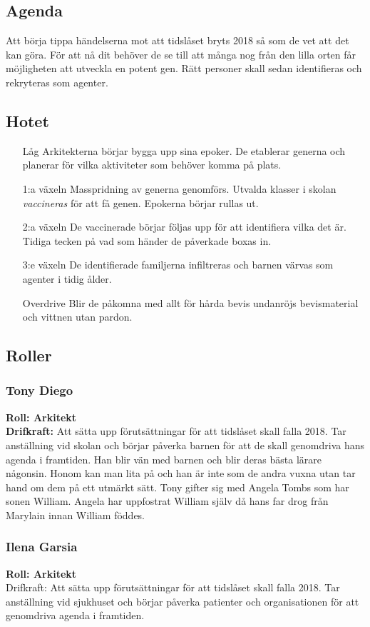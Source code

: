 \documentclass[a5paper,10pt]{report}
\begin{document}
\subsection{Agenda}
Att börja tippa händelserna mot att tidslåset bryts 2018 så som de vet att det kan göra. För att nå dit behöver de se till att många nog från den lilla orten får möjligheten att utveckla en potent gen. Rätt personer skall sedan identifieras och rekryteras som agenter.
\subsection{Hotet}
\begin{itemize}
  \item[Låg] Arkitekterna börjar bygga upp sina epoker. De etablerar generna och planerar för vilka aktiviteter som behöver komma på plats.
  \item[1:a växeln] Masspridning av generna genomförs. Utvalda klasser i skolan \textit{vaccineras} för att få genen. Epokerna börjar rullas ut.
  \item[2:a växeln] De vaccinerade börjar följas upp för att identifiera vilka det är. Tidiga tecken på vad som händer de påverkade boxas in.
  \item[3:e växeln] De identifierade familjerna infiltreras och barnen värvas som agenter i tidig ålder.
  \item[Overdrive] Blir de påkomna med allt för hårda bevis undanröjs bevismaterial och vittnen utan pardon.
\end{itemize}
\subsection{Roller}
\subsubsection{Tony Diego}
\textbf{Roll: Arkitekt}\\
\textbf{Drifkraft:} Att sätta upp förutsättningar för att tidslåset skall falla 2018. Tar anställning vid skolan och börjar påverka barnen för att de skall genomdriva hans agenda i framtiden. Han blir vän med barnen och blir deras bästa lärare någonsin. Honom kan man lita på och han är inte som de andra vuxna utan tar hand om dem på ett utmärkt sätt. Tony gifter sig med Angela Tombs som har sonen William. Angela har uppfostrat William själv då hans far drog från Marylain innan William föddes.
\subsubsection{Ilena Garsia}
\textbf{Roll: Arkitekt}\\
Drifkraft: Att sätta upp förutsättningar för att tidslåset skall falla 2018. Tar anställning vid sjukhuset och börjar påverka patienter och organisationen för att genomdriva agenda i framtiden.
\end{document}

